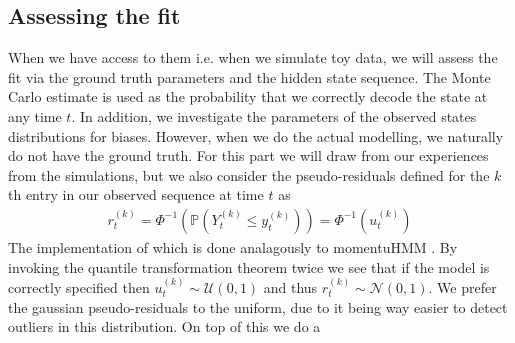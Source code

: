 \subsection{Assessing the fit}
When we have access to them i.e. when we simulate toy data, we will assess the fit via the ground truth parameters and the hidden state sequence. The Monte Carlo estimate is used as the probability that we correctly decode the state at any time $t$. In addition, we investigate the parameters of the observed states distributions for biases. However, when we do the actual modelling, we naturally do not have the ground truth. For this part we will draw from our experiences from the simulations, but we also consider the pseudo-residuals defined for the $k$th entry in our observed sequence at time $t$ as \cite{HHMForTimesSeries}
\begin{align}
    r_t^{(k)} = \Phi^{-1}\left(\mathbb{P}\left(Y_t^{(k)} \leq y_t^{(k)}\right)\right) = \Phi^{-1}\left(u_t^{(k)}\right)
\end{align}
The implementation of which is done analagously to momentuHMM \cite{momentuHMM}.
By invoking the quantile transformation theorem twice we see that if the model is correctly specified then $u_t^{(k)}\sim \mathcal{U}(0,1)$ and thus $r_t^{(k)}\sim\mathcal{N}\left(0,1\right)$. We prefer the gaussian pseudo-residuals to the uniform, due to it being way easier to detect outliers in this distribution. On top of this we do a 